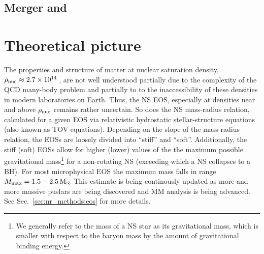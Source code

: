 \subsection{Merger and \pmerg{}}























































\section{Theoretical picture}

The properties and structure of matter at nuclear saturation density, 
$\rho_{\rm nuc}\approx2.7\times10^{14}\,$\gcm, are not well understood partially due to 
the complexity of the \ac{QCD} many-body problem and partially to to the 
inaccessibility of these densities in modern laboratories on Earth. Thus, the \ac{NS} 
\ac{EOS}, especially at densities near and above $\rho_{\rm nuc}$ remains rather uncertain.
So does the \ac{NS} mass-radius relation, calculated for a given \ac{EOS} via relativistic 
hydrostatic stellar-structure equations (also known as \ac{TOV} equations). 
Depending on the slope of the mass-radius relation, the \acp{EOS} are loosely divided into 
``stiff'' and ``soft''. Additionally, the stiff (soft) \acp{EOS} allow for higher (lower) 
values of the the maximum possible gravitational mass\footnote{
    We generally refer to the mass of a \ac{NS} star as its gravitational mass, which 
    is smaller with respect to the baryon mass by the amount of gravitational 
    binding energy. 
} for a non-rotating \ac{NS} (exceeding which a \ac{NS} collapses to a \ac{BH}).
For most microphysical \ac{EOS} 
the maximum mass falls in range $M_{\rm max}=1.5-2.5\,{\text{M}_{\odot}}$ \cite{e.g. Lattimer & Prakash, 2000)}
This estimate is being continously updated as more and more massive puslars are being 
discovered \cite{e.g. Demorest et al., 2010} and \ac{MM} analysis is being advanced.
See Sec.~\ref{sec:nr_methods:eos} for more details.

